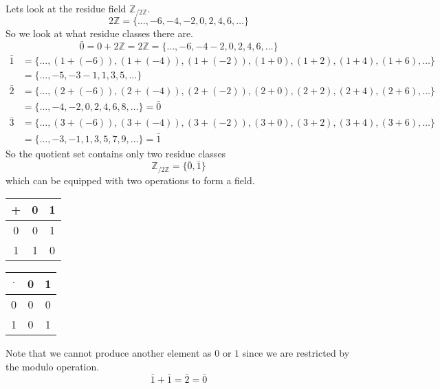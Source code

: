 \begin{example}
   Lets look at the residue field \(\mathbb{Z}_{/2\mathbb{Z}}\).
   \[2\mathbb{Z} = \{\ldots, -6, -4, -2, 0, 2, 4, 6, \ldots\}\]
   So we look at what residue classes there are.
   \[\bar{0} = 0 + 2\mathbb{Z} = 2\mathbb{Z} = \{\ldots, -6, -4 -2, 0, 2, 4, 6, \ldots\}\]
   \begin{equation*}
      \begin{split}
   \bar{1} & = \{\ldots, (1+(-6)), (1+(-4)), (1+(-2)), (1+0), (1+2), (1+4), (1+6), \ldots\} \\
                & = \{\ldots, -5, -3 -1, 1, 3, 5, \ldots\}
      \end{split}
   \end{equation*}
   \begin{equation*}
      \begin{split}
         \bar{2} &= \{\ldots, (2+(-6)), (2+(-4)), (2+(-2)), (2+0), (2+2), (2+4), (2+6), \ldots\} \\
                      &= \{\ldots, -4, -2, 0, 2, 4, 6, 8, \ldots\} = \bar{0}
      \end{split}
   \end{equation*}
   \begin{equation*}
      \begin{split}
         \bar{3} &= \{\ldots, (3+(-6)), (3+(-4)), (3+(-2)), (3+0), (3+2), (3+4), (3+6), \ldots\} \\
                      &= \{\ldots, -3, -1, 1, 3, 5, 7, 9, \ldots\} = \bar{1}
      \end{split}
   \end{equation*}
   So the quotient set contains only two residue classes
   \[\mathbb{Z}_{/2\mathbb{Z}} = \{\bar{0}, \bar{1}\}\]
   which can be equipped with two operations to form a field.

   \begin{center}
      \renewcommand\arraystretch{1.3}
      \begin{tabular}{c|c c}
         +   & 0   & 1 \\ \hline
         0   & 0   & 1 \\
         1   & 1   & 0 \\
      \end{tabular}
      \quad
      \begin{tabular}{c|c c}
         \(\cdot\) & 0   & 1 \\ \hline
         0         & 0   & 0 \\
         1         & 0   & 1 \\
      \end{tabular}
   \end{center}
   Note that we cannot produce another element as \(0\) or \(1\) since we are restricted by the modulo operation.
   \[\bar{1} + \bar{1} = \bar{2} = \bar{0}\]
\end{example}

